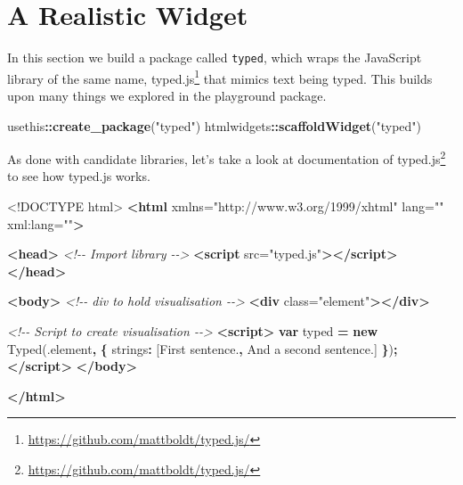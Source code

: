\documentclass[
]{krantz}
\makeatletter
\newenvironment{Shaded}{\begin{snugshade}}{\end{snugshade}}
\newcommand{\AttributeTok}[1]{\textcolor[rgb]{0.61,0.61,0.61}{#1}}
\newcommand{\CommentTok}[1]{\textcolor[rgb]{0.37,0.37,0.37}{\textit{#1}}}
\newcommand{\DataTypeTok}[1]{\textcolor[rgb]{0.27,0.27,0.27}{#1}}
\newcommand{\KeywordTok}[1]{\textcolor[rgb]{0.27,0.27,0.27}{\textbf{#1}}}
\newcommand{\NormalTok}[1]{#1}
\newcommand{\OperatorTok}[1]{\textcolor[rgb]{0.43,0.43,0.43}{\textbf{#1}}}
\newcommand{\OtherTok}[1]{\textcolor[rgb]{0.37,0.37,0.37}{#1}}
\newcommand{\StringTok}[1]{\textcolor[rgb]{0.5,0.5,0.5}{#1}}
\renewcommand{\href}[2]{#2\footnote{\url{#1}}}
\newenvironment{kframe}{%
\medskip{}
\setlength{\fboxsep}{.8em}
 \def\at@end@of@kframe{}%
 \ifinner\ifhmode%
  \def\at@end@of@kframe{\end{minipage}}%
  \begin{minipage}{\columnwidth}%
 \fi\fi%
 \def\FrameCommand##1{\hskip\@totalleftmargin \hskip-\fboxsep
 \colorbox{shadecolor}{##1}\hskip-\fboxsep
     \hskip-\linewidth \hskip-\@totalleftmargin \hskip\columnwidth}%
 \MakeFramed {\advance\hsize-\width
   \@totalleftmargin\z@ \linewidth\hsize
   \@setminipage}}%
 {\par\unskip\endMakeFramed%
 \at@end@of@kframe}
\renewenvironment{Shaded}{\begin{kframe}}{\end{kframe}}
\makeatother
\begin{document}
\hypertarget{a-realistic-widget}{%
\chapter{A Realistic Widget}\label{a-realistic-widget}}

In this section we build a package called \texttt{typed}, which wraps the JavaScript library of the same name, \href{https://github.com/mattboldt/typed.js/}{typed.js} that mimics text being typed. This builds upon many things we explored in the playground package.

\begin{Shaded}
\begin{Highlighting}[]
\NormalTok{usethis}\OperatorTok{::}\KeywordTok{create\_package}\NormalTok{(}\StringTok{"typed"}\NormalTok{)}
\NormalTok{htmlwidgets}\OperatorTok{::}\KeywordTok{scaffoldWidget}\NormalTok{(}\StringTok{"typed"}\NormalTok{)}
\end{Highlighting}
\end{Shaded}

As done with candidate libraries, let's take a look at documentation of \href{https://github.com/mattboldt/typed.js/}{typed.js} to see how typed.js works.

\begin{Shaded}
\begin{Highlighting}[]
\DataTypeTok{<!DOCTYPE }\NormalTok{html}\DataTypeTok{>}
\KeywordTok{<html}\OtherTok{ xmlns=}\StringTok{"http://www.w3.org/1999/xhtml"}\OtherTok{ lang=}\StringTok{""}\OtherTok{ xml:lang=}\StringTok{""}\KeywordTok{>}

\KeywordTok{<head>}
  \CommentTok{<!{-}{-} Import library {-}{-}>}
  \KeywordTok{<script}\OtherTok{ src=}\StringTok{"typed.js"}\KeywordTok{></script>}
\KeywordTok{</head>}

\KeywordTok{<body>}
  \CommentTok{<!{-}{-} div to hold visualisation {-}{-}>}
  \KeywordTok{<div}\OtherTok{ class=}\StringTok{"element"}\KeywordTok{></div>}

  \CommentTok{<!{-}{-} Script to create visualisation {-}{-}>}
  \KeywordTok{<script>}
    \KeywordTok{var}\NormalTok{ typed }\OperatorTok{=} \KeywordTok{new} \AttributeTok{Typed}\NormalTok{(}\StringTok{\textquotesingle{}.element\textquotesingle{}}\OperatorTok{,} \OperatorTok{\{}
      \DataTypeTok{strings}\OperatorTok{:}\NormalTok{ [}\StringTok{\textquotesingle{}First sentence.\textquotesingle{}}\OperatorTok{,} \StringTok{\textquotesingle{}And a second sentence.\textquotesingle{}}\NormalTok{]}
    \OperatorTok{\}}\NormalTok{)}\OperatorTok{;}
  \KeywordTok{</script>}
\KeywordTok{</body>}

\KeywordTok{</html>}
\end{Highlighting}
\end{Shaded}
\end{document}
